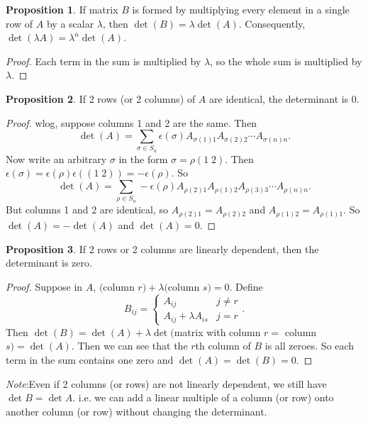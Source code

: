 \documentclass[a4paper]{article}
\theoremstyle{definition}
\newtheorem*{prop}{Proposition}
\newcommand{\note}{\noindent \emph{Note}:\;}
\begin{document}
\begin{prop}
  If matrix $B$ is formed by multiplying every element in a single row of $A$ by a scalar $\lambda$, then $\det (B) = \lambda \det (A)$. Consequently, $\det (\lambda A) = \lambda^n \det(A)$.
\end{prop}

\begin{proof}
  Each term in the sum is multiplied by $\lambda$, so the whole sum is multiplied by $\lambda$.
\end{proof}

\begin{prop}
  If 2 rows (or 2 columns) of $A$ are identical, the determinant is $0$.
\end{prop}

\begin{proof}
  wlog, suppose columns 1 and 2 are the same. Then
  \[
  \det (A) = \sum_{\sigma\in S_n} \epsilon(\sigma) A_{\sigma(1)1}A_{\sigma(2)2}\cdots A_{\sigma(n)n}.
  \]
  Now write an arbitrary $\sigma$ in the form $\sigma = \rho(1\; 2)$. Then $\epsilon(\sigma) = \epsilon(\rho)\epsilon((1\; 2)) = -\epsilon(\rho)$. So
  \[
  \det (A) = \sum_{\rho\in S_n} -\epsilon(\rho) A_{\rho(2)1}A_{\rho(1)2}A_{\rho(3)3}\cdots A_{\rho(n)n}.
  \]
  But columns 1 and 2 are identical, so $A_{\rho(2)1} = A_{\rho(2)2}$ and $A_{\rho(1)2} = A_{\rho(1)1}$. So $\det (A) = -\det (A)$ and $\det(A) = 0$.
\end{proof}

\begin{prop}
  If 2 rows or 2 columns are linearly dependent, then the determinant is zero.
\end{prop}

\begin{proof}
  Suppose in $A$, $($column $r) + \lambda($column $s) = 0$. Define
  \[
  B_{ij} =
  \begin{cases}
    A_{ij} & j\not= r\\
    A_{ij} + \lambda A_{is} & j = r
  \end{cases}.
  \]
  Then $\det (B) = \det(A) + \lambda \det($matrix with column $r =$ column $s) = \det(A)$. Then we can see that the $r$th column of $B$ is all zeroes. So each term in the sum contains one zero and $\det (A) = \det (B) = 0$.
\end{proof}
\note Even if 2 columns (or rows) are not linearly dependent, we still have $\det B = \det A$. i.e. we can add a linear multiple of a column (or row) onto another column (or row) without changing the determinant.
\end{document}
